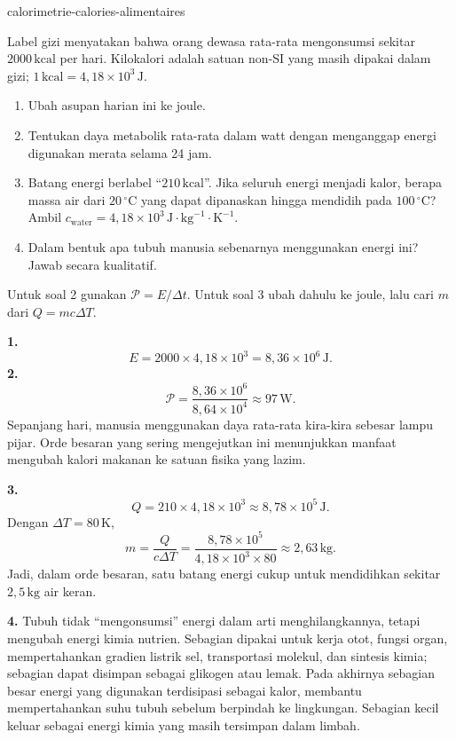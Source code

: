 \begin{exo}{calorimetrie-calories-alimentaires}

Label gizi menyatakan bahwa orang dewasa rata-rata mengonsumsi sekitar $2000\,\text{kcal}$ per hari. Kilokalori adalah satuan non-SI yang masih dipakai dalam gizi; $1\,\text{kcal}=4{,}18\times10^3\,\text{J}$.
\begin{enumerate}
  \item Ubah asupan harian ini ke joule.
  \item Tentukan daya metabolik rata-rata dalam watt dengan menganggap energi digunakan merata selama 24 jam.
  \item Batang energi berlabel ``$210\,\text{kcal}$''. Jika seluruh energi menjadi kalor, berapa massa air dari $20\,^\circ\text{C}$ yang dapat dipanaskan hingga mendidih pada $100\,^\circ\text{C}$? Ambil $c_{\text{water}}=4{,}18\times10^3\,\text{J}\!\cdot\!\text{kg}^{-1}\!\cdot\!\text{K}^{-1}$.
  \item Dalam bentuk apa tubuh manusia sebenarnya menggunakan energi ini? Jawab secara kualitatif.
\end{enumerate}
\begin{indication}
Untuk soal 2 gunakan $\mathcal P=E/\Delta t$. Untuk soal 3 ubah dahulu ke joule, lalu cari $m$ dari $Q=mc\Delta T$.
\end{indication}
\begin{solution}
\textbf{1.}
\[
E=2000\times4{,}18\times10^3=8{,}36\times10^6\,\text{J}.
\]
\textbf{2.}
\[
\mathcal P=\frac{8{,}36\times10^6}{8{,}64\times10^4}\approx97\,\text{W}.
\]
Sepanjang hari, manusia menggunakan daya rata-rata kira-kira sebesar lampu pijar. Orde besaran yang sering mengejutkan ini menunjukkan manfaat mengubah kalori makanan ke satuan fisika yang lazim.

\textbf{3.}
\[
Q=210\times4{,}18\times10^3\approx8{,}78\times10^5\,\text{J}.
\]
Dengan $\Delta T=80\,\text{K}$,
\[
m=\frac{Q}{c\Delta T}
=\frac{8{,}78\times10^5}{4{,}18\times10^3\times80}
\approx2{,}63\,\text{kg}.
\]
Jadi, dalam orde besaran, satu batang energi cukup untuk mendidihkan sekitar $2{,}5\,\text{kg}$ air keran.

\textbf{4.} Tubuh tidak “mengonsumsi” energi dalam arti menghilangkannya, tetapi mengubah energi kimia nutrien. Sebagian dipakai untuk kerja otot, fungsi organ, mempertahankan gradien listrik sel, transportasi molekul, dan sintesis kimia; sebagian dapat disimpan sebagai glikogen atau lemak. Pada akhirnya sebagian besar energi yang digunakan terdisipasi sebagai kalor, membantu mempertahankan suhu tubuh sebelum berpindah ke lingkungan. Sebagian kecil keluar sebagai energi kimia yang masih tersimpan dalam limbah.
\end{solution}
\end{exo}
